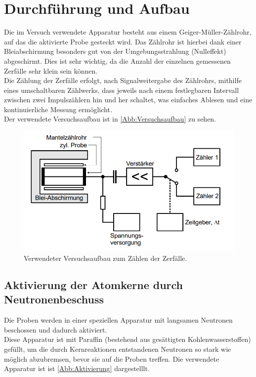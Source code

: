 \section{Durchführung und Aufbau}
\label{sec:Durchführung}
Die im Versuch verwendete Apparatur besteht aus einem Geiger-Müller-Zählrohr, auf das die aktivierte Probe gesteckt wird.
Das Zählrohr ist hierbei dank einer Bleiabschirmung besonders gut von der Umgebungsstrahlung (Nulleffekt) abgeschirmt. Dies
ist sehr wichtig, da die Anzahl der einzelnen gemessenen Zerfälle sehr klein sein können.\\
Die Zählung der Zerfälle erfolgt, nach Signalweitergabe des Zählrohrs, mithilfe eines umschaltbaren Zählwerks, dass jeweils nach einem
festlegbaren Intervall zwischen zwei Impulszählern hin und her schaltet, was einfaches Ablesen und eine kontinuierliche Messung
ermöglicht.\\
Der verwendete Versuchsaufbau ist in \autoref{Abb:Versuchsaufbau} zu sehen.
\begin{figure}
    \centering
    \includegraphics[width=15cm]{Bilder/Versuchsaufbau.png}
    \caption{Verwendeter Versuchsaufbau zum Zählen der Zerfälle.\cite{sample}}
    \label{Abb:Versuchsaufbau}
\end{figure}

\subsection{Aktivierung der Atomkerne durch Neutronenbeschuss}

Die Proben werden in einer speziellen Apparatur mit langsamen Neutronen beschossen und dadurch aktiviert.\\
Diese Apparatur ist mit Paraffin (bestehend aus gesättigten Kohlenwasserstoffen) gefüllt, um die durch Kernreaktionen
entstandenen Neutronen so stark wie möglich abzubremsen, bevor sie auf die Proben treffen. Die verwendete 
Apparatur ist ist \autoref{Abb:Aktivierung} dargestelllt.


